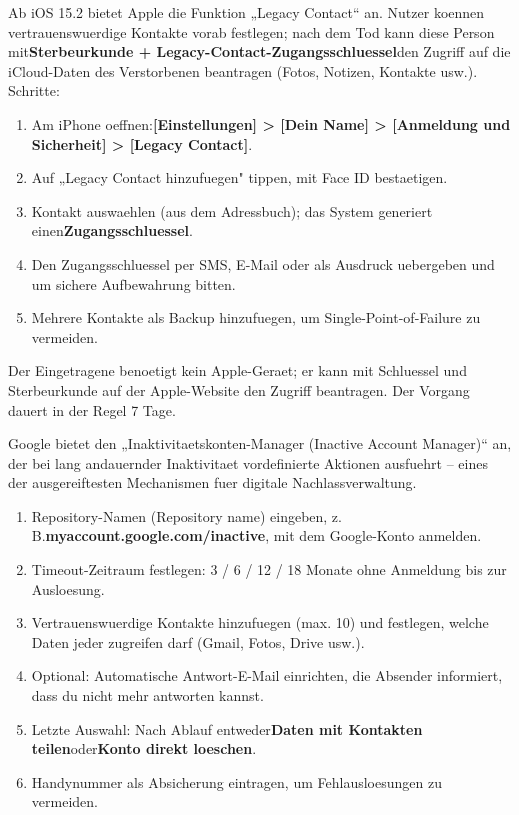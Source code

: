 
Ab iOS 15.2 bietet Apple die Funktion „Legacy Contact“ an. Nutzer koennen vertrauenswuerdige Kontakte vorab festlegen; nach dem Tod kann diese Person mit\textbf{Sterbeurkunde + Legacy-Contact-Zugangsschluessel}den Zugriff auf die iCloud-Daten des Verstorbenen beantragen (Fotos, Notizen, Kontakte usw.). Schritte:

\begin{enumerate}
  \item Am iPhone oeffnen:\textbf{[Einstellungen] > [Dein Name] > [Anmeldung und Sicherheit] > [Legacy Contact]}.
  \item Auf „Legacy Contact hinzufuegen" tippen, mit Face ID bestaetigen.
  \item Kontakt auswaehlen (aus dem Adressbuch); das System generiert einen\textbf{Zugangsschluessel}.
  \item Den Zugangsschluessel per SMS, E-Mail oder als Ausdruck uebergeben und um sichere Aufbewahrung bitten.
  \item Mehrere Kontakte als Backup hinzufuegen, um Single-Point-of-Failure zu vermeiden.
\end{enumerate}

Der Eingetragene benoetigt kein Apple-Geraet; er kann mit Schluessel und Sterbeurkunde auf der Apple-Website den Zugriff beantragen. Der Vorgang dauert in der Regel 7 Tage.


Google bietet den „Inaktivitaetskonten-Manager (Inactive Account Manager)“ an, der bei lang andauernder Inaktivitaet vordefinierte Aktionen ausfuehrt – eines der ausgereiftesten Mechanismen fuer digitale Nachlassverwaltung.

\begin{enumerate}
  \item Repository-Namen (Repository name) eingeben, z. B.\textbf{myaccount.google.com/inactive}, mit dem Google-Konto anmelden.
  \item Timeout-Zeitraum festlegen: 3 / 6 / 12 / 18 Monate ohne Anmeldung bis zur Ausloesung.
  \item Vertrauenswuerdige Kontakte hinzufuegen (max. 10) und festlegen, welche Daten jeder zugreifen darf (Gmail, Fotos, Drive usw.).
  \item Optional: Automatische Antwort-E-Mail einrichten, die Absender informiert, dass du nicht mehr antworten kannst.
  \item Letzte Auswahl: Nach Ablauf entweder\textbf{Daten mit Kontakten teilen}oder\textbf{Konto direkt loeschen}.
  \item Handynummer als Absicherung eintragen, um Fehlausloesungen zu vermeiden.
\end{enumerate}

